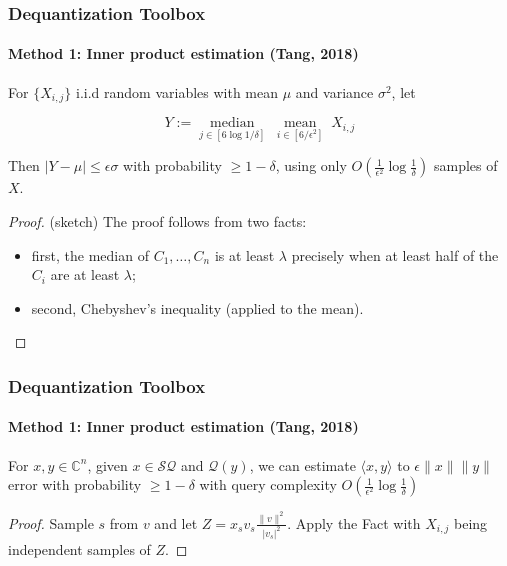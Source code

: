 \documentclass{beamer}
\newcommand\0{\mathbf{0}}
\newcommand\CC{\mathbb{C}}
\newcommand\<{\langle}
\renewcommand\>{\rangle}
\begin{document}
\begin{frame}
\frametitle{Dequantization Toolbox}
\framesubtitle{Method 1: Inner product estimation (Tang, 2018)}
\begin{fact} For $\{X_{i,j}\}$ i.i.d random variables with mean $\mu$ and variance $\sigma^2$, let 

$$Y := \underset{j \in [6\log 1/\delta]}{\operatorname{median}}\;\underset{i \in [6/\epsilon^2]}{\operatorname{mean}}\;X_{i,j}$$ 

Then $\vert Y - \mu\vert \leq \epsilon\sigma$ with probability $\geq 1-\delta$, using only $O(\frac{1}{\epsilon^2}\log\frac{1}{\delta})$ samples of $X$.
\end{fact}
\begin{proof} (sketch) The proof follows from two facts: 

\begin{itemize}
\item first, the median of $C_1,\ldots,C_n$ is at least $\lambda$ precisely when at least half of the $C_i$ are at least $\lambda$; 
\item second, Chebyshev's inequality (applied to the mean).
\end{itemize}
\end{proof}
\end{frame}

\begin{frame}
\frametitle{Dequantization Toolbox}
\framesubtitle{Method 1: Inner product estimation (Tang, 2018)}
\begin{corollary} For $x,y \in\CC^n$, given $x \in \mathcal{SQ}$ and $\mathcal{Q}(y)$, we can estimate $\langle x,y\rangle$ to $\epsilon\|x\|\|y\|$ error with probability $\geq 1-\delta$ with query complexity $O(\frac{1}{\epsilon^2}\log\frac{1}{\delta})$
\end{corollary}

\begin{proof}Sample $s$ from $v$ and let $Z = x_s v_s\frac{\|v\|^2}{|v_s|^2}$. Apply the Fact with $X_{i,j}$ being independent samples of $Z$.
\end{proof}	
\end{frame}
\end{document}
